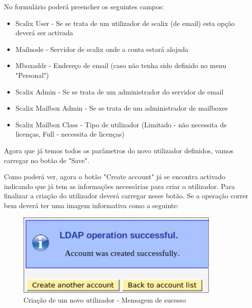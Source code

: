 No formulário poderá preencher os seguintes campos:

\begin{itemize}
\item Scalix User - Se se trata de um utilizador de scalix (de email) esta opção deverá ser activada
\item Mailnode - Servidor de scalix onde a conta estará alojada
\item Mboxaddr - Endereço de email (caso não tenha sido definido no menu "Personal")
\item Scalix Admin - Se se trata de um administrador do servidor de email
\item Scalix Mailbox Admin - Se se trata de um administrador de mailboxes
\item Scalix Mailbox Class - Tipo de utilizador (Limitado - não necessita de licenças, Full - necessita de licenças)
\end{itemize}

Agora que já temos todos os parâmetros do novo utilizador definidos, vamos carregar no botão de "Save".

Como poderá ver, agora o botão "Create account" já se encontra activado indicando que já tem as informações necessárias para criar o utilizador. Para finalizar a criação do utilizador deverá carregar nesse botão. Se a operação correr bem deverá ter uma imagem informativa como a seguinte:

\begin{figure}[H]
    \begin{center}
        \includegraphics[width=10cm]{include/img/lam15}
    \end{center}
    \caption{Criação de um novo utilizador - Mensagem de sucesso}
    \label{fig:LAM15}
\end{figure}


